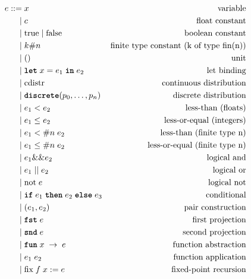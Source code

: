 \documentclass[acmsmall,screen,dvipsnames,x11names,nonacm,anonymous,review]{acmart}
\begin{document}
\begin{figure}[h]
\begin{align*}
e ::= &\; x                               & \text{variable} \\
    | &\; c                               & \text{float constant} \\
    | &\; \text{true} \mid \text{false}   & \text{boolean constant} \\
    | &\; k\#n                            & \text{finite type constant (k of type fin(n))} \\
    | &\; ()                              & \text{unit} \\
    | &\; \letkw \; x = e_1\; \inkw \; e_2  & \text{let binding} \\
    | &\; \text{cdistr}                   & \text{continuous distribution} \\
    | &\; \discrete(p_0, \ldots, p_{n})      & \text{discrete distribution} \\
    | &\; e_1 < e_2                       & \text{less-than (floats)} \\
    | &\; e_1 \leq e_2                    & \text{less-or-equal (integers)} \\
    | &\; e_1 <\#n\; e_2                  & \text{less-than (finite type n)} \\
    | &\; e_1 \leq\#n\; e_2               & \text{less-or-equal (finite type n)} \\
    | &\; e_1 \&\& e_2                    & \text{logical and} \\
    | &\; e_1 \mid\mid e_2                & \text{logical or} \\
    | &\; \text{not}\; e                  & \text{logical not} \\
    | &\; \ifkw \; e_1\; \thenkw \; e_2\; \elsekw \; e_3 & \text{conditional} \\
    | &\; (e_1, e_2)                      & \text{pair construction} \\
    | &\; \fstkw \; e                     & \text{first projection} \\
    | &\; \sndkw \; e                     & \text{second projection} \\
    | &\; \funkw \; x \; \rightarrow \; e & \text{function abstraction} \\
    | &\; e_1 \; e_2                      & \text{function application} \\
    | &\; \text{fix}\; f\; x := e         & \text{fixed-point recursion} \\

\end{align*}
\end{figure}
\end{document}
